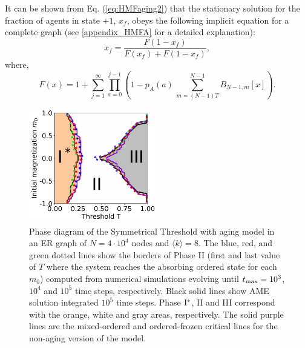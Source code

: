It can be shown from Eq. (\ref{eq:HMFaging2}) that the stationary solution  for the fraction of agents in state $+1$, $x_f$, obeys the following implicit equation for a complete graph (see \ref{appendix_HMFA} for a detailed explanation):
\begin{equation}
    x_f = \frac{F(1 - x_f)}{F(x_f) + F(1-x_f)},
    \label{eq:x_f}
\end{equation}
where,
\begin{equation}
    F(x) = 1 + \sum_{j=1}^{\infty} \prod_{a=0}^{j-1} \left( 1 - p_A(a) \, \sum_{m = (N-1)T}^{N-1} B_{N-1,m}[x] \right).
    \label{eq:F(A)}
\end{equation}

\begin{figure}
        \centering \captionsetup{font=sf}
        \includegraphics[width=0.5\textwidth]{Figs/Aging_STM/FIG5.pdf}
        \caption[Phase diagram modified by aging.]{\label{ER_REG_PDAGING} Phase diagram of the Symmetrical Threshold with aging model in an ER graph of $N = 4 \cdot 10^4$ nodes and $\langle k \rangle = 8$. The blue, red, and green dotted lines show the borders of Phase II (first and last value of $T$ where the system reaches the absorbing ordered state for each $m_0$) computed from numerical simulations evolving until $t_{\rm max} = 10^3$, $10^4$ and $10^5$ time steps, respectively. Black solid lines show AME solution integrated $10^5$ time steps. Phase ${\rm I}^{*}$, II and III correspond with the orange, white and gray areas, respectively. The solid purple lines are the mixed-ordered and ordered-frozen critical lines for the non-aging version of the model.}
\end{figure}


